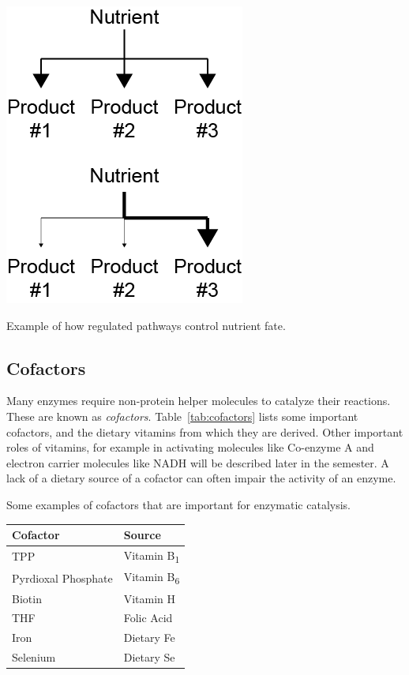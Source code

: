 \documentclass{tufte-handout}
\begin{document}
\begin{marginfigure}
\includegraphics[width=0.75\marginparwidth]{figures/nutrient-pathways.png}\
\caption{Example of how regulated pathways control nutrient fate.}
\label{fig:nutrient-pathways}
\end{marginfigure}

\subsection{Cofactors}
Many enzymes require non-protein helper molecules to catalyze their reactions.  These are known as \emph{cofactors}.  Table~\ref{tab:cofactors} lists some important cofactors, and the dietary vitamins from which they are derived.  Other important roles of vitamins, for example in activating molecules like Co-enzyme A and electron carrier molecules like NADH will be described later in the semester.  A lack of a dietary source of a cofactor can often impair the activity of an enzyme.

\begin{margintable}
\caption{Some examples of cofactors that are important for enzymatic catalysis.}\label{tab:cofactors}
\begin{tabular}{@{}ll@{}}
 \textbf{Cofactor}  & \textbf{Source}           \\ \midrule
TPP & Vitamin B\textsubscript{1} \\
Pyrdioxal Phosphate & Vitamin B\textsubscript{6} \\
Biotin & Vitamin H \\
THF & Folic Acid \\
Iron &  Dietary Fe \\ 
Selenium & Dietary Se \\ \bottomrule
\end{tabular}
\end{margintable}
\end{document}
